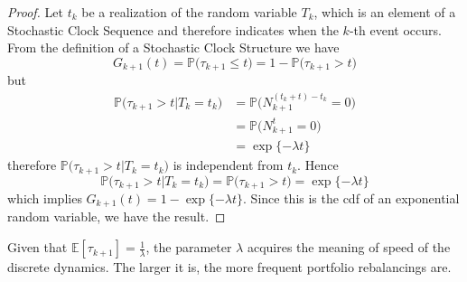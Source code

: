 \begin{proof}
	Let $t_k$ be a realization of the random variable $T_k$, which is an element of a Stochastic Clock Sequence and therefore indicates when the $k$-th event occurs. From the definition of a Stochastic Clock Structure we have
	\[
	G_{k+1}(t)= \mathbb{P}\big(\tau_{k+1}\leq t\big) = 1 - \mathbb{P}\big(\tau_{k+1}> t\big)
	\]
	but 
	\begin{align*}
	\mathbb{P}\big(\tau_{k+1}>t \lvert T_k = t_k\big) &= \mathbb{P}\big(N^{(t_k+t)-t_k}_{k+1}=0\big)\\
	& =\mathbb{P}\big(N^{t}_{k+1}=0\big)  \\
	& = \exp\{-\lambda t \}
	\end{align*}
	therefore $\mathbb{P}\big(\tau_{k+1}>t \lvert T_k = t_k\big)$ is independent from $t_k$. Hence 
	\[
	\mathbb{P}\big(\tau_{k+1}>t \lvert T_k = t_k\big) = \mathbb{P}\big(\tau_{k+1}> t\big) = \exp\{-\lambda t \} 
	\]
	which implies $G_{k+1}(t)=1-\exp\{-\lambda t \}$. Since this is the cdf of an exponential random variable, we have the result.
\end{proof}
\begin{remark}
	Given that $\mathbb{E}[\tau_{k+1}]=\frac{1}{\lambda}$, the parameter $\lambda$ acquires the meaning of speed of the discrete dynamics. The larger it is, the more frequent portfolio rebalancings are.
\end{remark}

